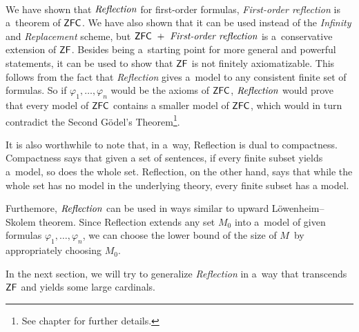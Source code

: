 \


We have shown that $\emph{Reflection}$ for first-order formulas, \emph{First-order reflection} is a~theorem of $\sf{ZFC}$.%
We have also shown that it can be used instead of the \emph{Infinity} and \emph{Replacement} scheme, but $\sf{ZFC}\ +\ \emph{First-order reflection}$ is a~conservative extension of $\sf{ZF}$. Besides being a~starting point for more general and powerful statements, it can be used to show that $\sf{ZF}$ is not finitely axiomatizable. This follows from the fact that \emph{Reflection} gives a~model to any consistent finite set of formulas. %
So if $\varphi_1, \ldots, \varphi_n$ would be the axioms of $\sf{ZFC}$, $\emph{Reflection}$ would prove that every model of $\sf{ZFC}$ contains a smaller model of $\sf{ZFC}$, which would in turn contradict the Second Gödel's Theorem\footnote{See chapter  for further details.}.

It is also worthwhile to note that, in a~way, Reflection is dual to compactness. 
Compactness says that given a set of sentences, if every finite subset yields a~model, so does the whole set. Reflection, on the other hand, says that while the whole set has no model in the underlying theory, every finite subset has a model.

Furthemore, $\emph{Reflection}$ can be used in ways similar to upward Löwenheim–Skolem theorem.
Since Reflection extends any set $M_0$ into a~model of given formulas $\varphi_1, \ldots, \varphi_n$, we can choose the lower bound of the size of $M$ by appropriately choosing $M_0$.

In the next section, we will try to generalize \emph{Reflection} in a~way that transcends $\sf{ZF}$ and yields some large cardinals.
\newpage
